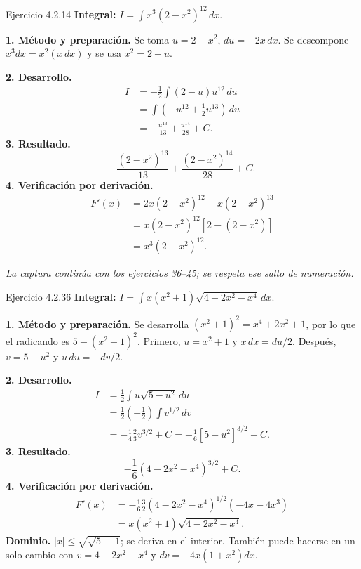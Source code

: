 \begin{examplebox}{Ejercicio 4.2.14}
\textbf{Integral:} $\displaystyle I=\int x^3(2-x^2)^{12}\,dx$.

\textbf{1. Método y preparación.} Se toma $u=2-x^2$, $du=-2x\,dx$. Se descompone $x^3dx=x^2(x\,dx)$ y se usa $x^2=2-u$.

\textbf{2. Desarrollo.}
\begin{align*}
I&=-\frac12\int(2-u)u^{12}\,du\\&=\int\left(-u^{12}+\frac12u^{13}\right)\,du\\&=-\frac{u^{13}}{13}+\frac{u^{14}}{28}+C.
\end{align*}
\textbf{3. Resultado.}
\[
-\frac{(2-x^2)^{13}}{13}+\frac{(2-x^2)^{14}}{28}+C.
\]
\textbf{4. Verificación por derivación.}
\begin{align*}
F'(x)&=2x(2-x^2)^{12}-x(2-x^2)^{13}\\&=x(2-x^2)^{12}[2-(2-x^2)]\\&=x^3(2-x^2)^{12}.
\end{align*}
\end{examplebox}

\noindent\textit{La captura continúa con los ejercicios 36--45; se respeta ese salto de numeración.}

\begin{examplebox}{Ejercicio 4.2.36}
\textbf{Integral:} $\displaystyle I=\int x(x^2+1)\sqrt{4-2x^2-x^4}\,dx$.

\textbf{1. Método y preparación.} Se desarrolla $(x^2+1)^2=x^4+2x^2+1$, por lo que el radicando es $5-(x^2+1)^2$. Primero, $u=x^2+1$ y $x\,dx=du/2$. Después, $v=5-u^2$ y $u\,du=-dv/2$.

\textbf{2. Desarrollo.}
\begin{align*}
I&=\frac12\int u\sqrt{5-u^2}\,du\\&=\frac12\left(-\frac12\right)\int v^{1/2}\,dv\\&=-\frac14\frac23v^{3/2}+C=-\frac16[5-u^2]^{3/2}+C.
\end{align*}
\textbf{3. Resultado.}
\[
-\frac16(4-2x^2-x^4)^{3/2}+C.
\]
\textbf{4. Verificación por derivación.}
\begin{align*}
F'(x)&=-\frac16\frac32(4-2x^2-x^4)^{1/2}(-4x-4x^3)\\&=x(x^2+1)\sqrt{4-2x^2-x^4}.
\end{align*}
\textbf{Dominio.} $|x|\le\sqrt{\sqrt5-1}$; se deriva en el interior. También puede hacerse en un solo cambio con $v=4-2x^2-x^4$ y $dv=-4x(1+x^2)dx$.
\end{examplebox}

